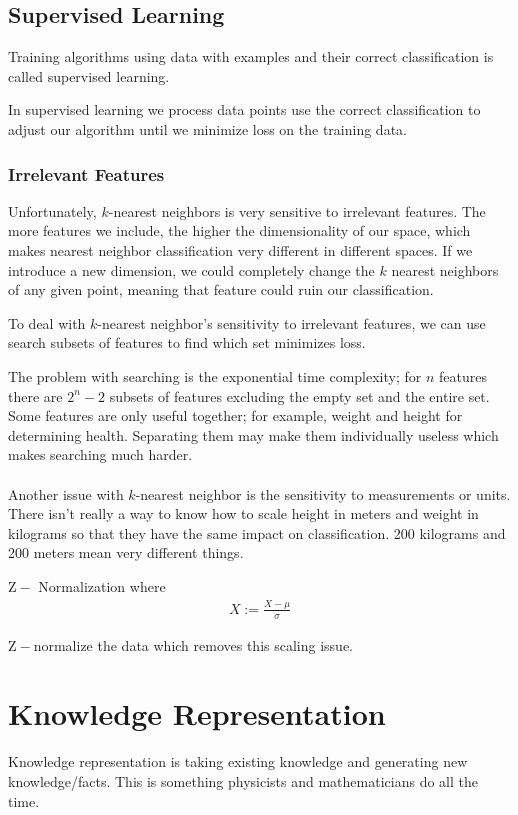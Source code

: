 \documentclass{chezarticle}
\begin{document}
\subsection{Supervised Learning}
\begin{definition}
Training algorithms using data with examples and their correct classification is called supervised learning.
\end{definition}
In supervised learning we process data points use the correct classification to adjust our algorithm until we minimize loss on the training data. 
\subsubsection{Irrelevant Features}
Unfortunately, $k$-nearest neighbors is very sensitive to irrelevant features. The more features we include, the higher the dimensionality of our space, which makes nearest neighbor classification very different in different spaces. If we introduce a new dimension, we could completely change the $k$ nearest neighbors of any given point, meaning that feature could ruin our classification.
\begin{proposition}
To deal with $k$-nearest neighbor's sensitivity to irrelevant features, we can use search subsets of features to find which set minimizes loss.
\end{proposition}
The problem with searching is the exponential time complexity; for $n$ features there are $2^n - 2$ subsets of features excluding the empty set and the entire set. Some features are only useful together; for example, weight and height for determining health. Separating them may make them individually useless which makes searching much harder. 
\\
\\
Another issue with $k$-nearest neighbor is the sensitivity to measurements or units. There isn't really a way to know how to scale height in meters and weight in kilograms so that they have the same impact on classification. 200 kilograms and 200 meters mean very different things.
\begin{definition}
$\mathrm{Z}-$ Normalization where
\begin{align*}
    X := \frac{X - \mu}{\sigma}
\end{align*}

\end{definition}$\mathrm{Z}-$normalize the data which removes this scaling issue.





















\section{Knowledge Representation}
Knowledge representation is taking existing knowledge and generating new knowledge/facts. This is something physicists and mathematicians do all the time.
\end{document}
